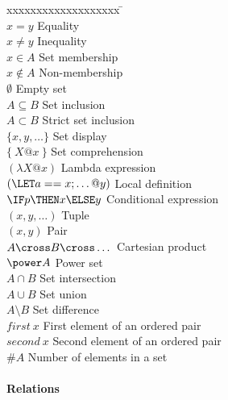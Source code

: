 \documentclass{article}
\begin{document}
\begin{tabbing}
xxxxxxxxxxxxxxxxxxx \= \kill \\ 
$x = y$ \> Equality \\
$x \neq y$ \> Inequality \\
$x \in A$ \> Set membership \\
$x \notin A$ \> Non-membership \\
$\emptyset$ \> Empty set \\
$A \subseteq B$ \> Set inclusion \\
$A \subset B$ \> Strict set inclusion \\
$\{ x, y, \dots \}$ \> Set display \\
$\{~ X @ x ~\}$ \> Set comprehension \\
$(\lambda X @ x)$ \> Lambda expression \\
$(\LET a == x; \dots @ y)$ \> Local definition \\
$\IF p \THEN x \ELSE y$ \> Conditional expression \\
$(x,y, \dots)$ \> Tuple \\
$(x,y)$ \> Pair \\
$A \cross B \cross \dots$ \> Cartesian product \\
$\power A$ \> Power set \\
$A \cap B$ \> Set intersection \\
$A \cup B$ \> Set union \\
$A \setminus B$ \> Set difference \\
$first~x$ \> First element of an ordered pair \\
$second~x$ \> Second element of an ordered pair \\
$\# A$ \> Number of elements in a set \\
\end{tabbing}

\paragraph{Relations}
\end{document}

